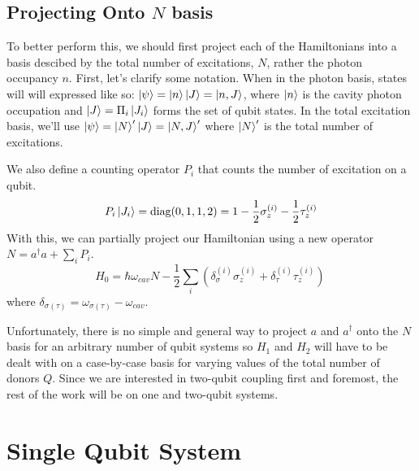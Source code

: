 \documentclass[
    preprint,
    amsmath,amssymb,
    aps,
    prb,
    floatfix,
]{revtex4-2}
\begin{document}
    \subsection{Projecting Onto $N$ basis}
    To better perform this, we should first project each of the Hamiltonians into a basis descibed by the total number of excitations, $N$, rather the photon occupancy $n$. First, let's clarify some notation. When in the photon basis, states will will expressed like so: $\ket{\psi} = \ket{n}\ket{J}=\ket{n,J}$, where $\ket{n}$ is the cavity photon occupation and $\ket{J}=\Pi_i\ket{J_i}$ forms the set of qubit states. In the total excitation basis, we'll use $\ket{\psi} = \ket{N}'\ket{J}=\ket{N,J}'$ where $\ket{N}'$ is the total number of excitations.

    We also define a counting operator $P_i$ that counts the number of excitation on a qubit.
    \begin{equation}
        P_i\ket{J_i} = \textrm{diag}(0,1,1,2) = 1-\frac{1}{2}\sigma_z^{(i)}-\frac{1}{2}\tau_z^{(i)}
    \end{equation}
    With this, we can partially project our Hamiltonian using a new operator $N = a^\dagger a + \sum_i P_i$.
    \begin{equation}
        H_0 = \hbar\omega_{cav}N - \frac{1}{2}\sum_i \left(\delta_\sigma^{(i)}\sigma_z^{(i)}+\delta_\tau^{(i)}\tau_z^{(i)}\right) \,
    \end{equation}
    where $\delta_{\sigma(\tau)} = \omega_{\sigma(\tau)}-\omega_{cav}$.
    
    Unfortunately, there is no simple and general way to project $a$ and $a^\dagger$ onto the $N$ basis for an arbitrary number of qubit systems so $H_1$ and $H_2$ will have to be dealt with on a case-by-case basis for varying values of the total number of donors $Q$. Since we are interested in two-qubit coupling first and foremost, the rest of the work will be on one and two-qubit systems.
    
    \section{Single Qubit System}
\end{document}
